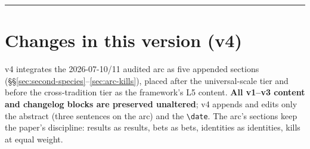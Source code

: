 \documentclass[11pt,a4paper]{article}
\begin{document}
\vspace{0.5em}
\hrule
\vspace{0.5em}

\section*{Changes in this version (v4)}

v4 integrates the 2026-07-10/11 audited arc as five appended sections (\S\S\ref{sec:second-species}--\ref{sec:arc-kills}), placed after the universal-scale tier and before the cross-tradition tier as the framework's L5 content. \textbf{All v1--v3 content and changelog blocks are preserved unaltered}; v4 appends and edits only the abstract (three sentences on the arc) and the \texttt{\textbackslash date}. The arc's sections keep the paper's discipline: results as results, bets as bets, identities as identities, kills at equal weight.
\end{document}

